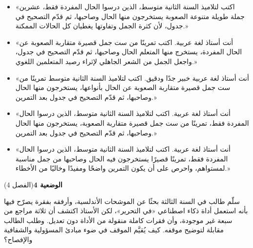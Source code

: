 \documentclass[11pt,a4paper]{article}
\begin{document}
\begin{itemize}[leftmargin=1.0cm, labelsep=6pt, itemsep=3pt, topsep=4pt, parsep=0pt]
  \item[\textbf{أ)}] «اكتب لتلاميذ السنة الثانية متوسط، الذين درسوا الحال المفردة فقط، عشرين جملة طويلة متنوعة الصعوبة يستخرجون منها الحال وصاحبها، ثم قدّم التصحيح في جدول، لأن كثرة الجمل وتفاوتها يغطيان كل الحالات الممكنة.»
  \item[\textbf{ب)}] «أنت أستاذ لغة عربية. اكتب تمرينًا من ست جمل قصيرة متقاربة الصعوبة عن الحال المفردة، يستخرج منها المتعلم الحال وصاحبها، ثم قدّم التصحيح في جدول، واجعل الجمل من الشعر الجاهلي لإثراء رصيد المتعلمين اللغوي.»
  \item[\textbf{ج)}] «أنت أستاذ لغة عربية خبير جدًا ودقيق. اكتب لتلاميذ السنة الثانية متوسط تمرينًا من ست جمل قصيرة متقاربة الصعوبة عن الحال بأنواعها، يستخرجون منها الحال وصاحبها، ثم قدّم التصحيح في جدول بعد التمرين.»
  \item[\textbf{د)}] «أنت أستاذ لغة عربية. اكتب لتلاميذ السنة الثانية متوسط، الذين درسوا الحال المفردة فقط، تمرينًا من ست جمل قصيرة متقاربة الصعوبة، يستخرجون منها الحال وصاحبها، ثم قدّم التصحيح في جدول بعد التمرين.»
  \item[\textbf{هـ)}] «أنت أستاذ لغة عربية. اكتب لتلاميذ السنة الثانية متوسط، الذين درسوا الحال المفردة فقط، تمرينًا قصيرًا يستخرجون فيه الحال وصاحبها من جمل مناسبة لمستواهم، واحرص على أن يكون التمرين واضحًا ومفيدًا وخاليًا من الأخطاء.»
\end{itemize}
\par\vspace{6pt}
\noindent
{\large\khatt\textbf{الوضعية 4}}\hfill{\small(الفصل 4)}\par\nopagebreak\vspace{3pt}
\setlength{\fboxsep}{7pt}\colorbox{gray!10}{\parbox{\dimexpr\linewidth-14pt}{سلّم طالب في السنة الثالثة بحثًا عن الموشحات الأندلسية، وأرفقه بفقرة يصرّح فيها بأنه استعمل أداة ذكاء اصطناعي «في التحرير»، لكن الأستاذ اكتشف أن ثلاثة مراجع من سبعة غير موجودة، وأن فقرات كاملة منقولة من الأداة دون تعديل. وطلب الطالب مقابلة لتوضيح موقفه. كيف يُقيَّم الموقف في ضوء مبادئ المسؤولية والشفافية والإفصاح؟}}\par\nopagebreak
\end{document}
